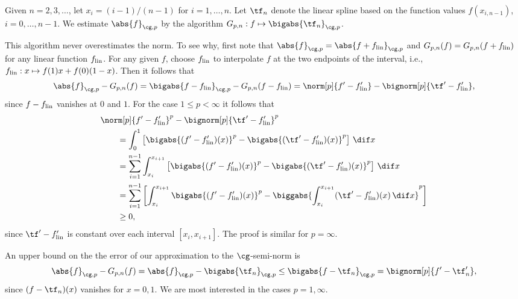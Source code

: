 \documentclass[final]{elsarticle}
\newcommand{\flin}{f_{\text{\rm{lin}}}}
\newcommand{\Gnorm}[2]{\abs{#2}_{\cg,#1}}
\theoremstyle{definition}
\theoremstyle{remark}
\begin{document}
Given $n =2, 3, \ldots$, let $x_i=(i-1)/(n-1)$ for $i=1, \ldots, n$.  Let $\tf_n$ denote the linear spline based on the function values $f(x_{i,n-1})$, $i=0, \ldots, n-1$. We  estimate $\Gnorm{p}{f}$ by the algorithm $G_{p,n}:f \mapsto \bigabs{\tf_n}_{\cg,p}$.  

This algorithm never overestimates the norm.  To see why, first note that $\Gnorm{p}{f}=\Gnorm{p}{f+\flin}$ and $G_{p,n}(f)=G_{p,n}(f+\flin)$ for any linear function $\flin$.  For any given $f$, choose $\flin$ to interpolate $f$ at the two endpoints of the interval, i.e., $\flin:x \mapsto f(1)x+f(0)(1-x)$.  Then it follows that
\[
\Gnorm{p}{f} - G_{p,n}(f) = \bigabs{f-\flin}_{\cg,p}- G_{p,n}(f-\flin) = \norm[p]{f'-\flin'} - \bignorm[p]{\tf'-\flin'},
\]
since $f-\flin$ vanishes at $0$ and $1$. For the case $1 \le p < \infty$ it follows that
\begin{align*}
\MoveEqLeft{\norm[p]{f'-\flin'}^p - \bignorm[p]{\tf'-\flin'}^p}\\
 & = \int_0^1 \left[\bigabs{(f'-\flin')(x)}^p - \bigabs{(\tf'-\flin')(x)}^p \right] \, \dif x \\
& = \sum_{i=1}^{n-1} \int_{x_{i}}^{x_{i+1}} \left[\bigabs{(f'-\flin')(x)}^p - \bigabs{(\tf'-\flin')(x)}^p \right] \, \dif x \\
& = \sum_{i=1}^{n-1} \left[ \int_{x_{i}}^{x_{i+1}} \bigabs{(f'-\flin')(x)}^p - \biggabs{\int_{x_{i}}^{x_{i+1}} (\tf'-\flin')(x) \, \dif x}^p \right] \\
& \ge 0,
\end{align*}
since $\tf'-\flin'$ is constant over each interval $[x_i,x_{i+1}]$.  The proof is similar for $p=\infty$.

An upper bound on the the error of our approximation to the $\cg$-semi-norm is 
\begin{equation*}
\Gnorm{p}{f} - G_{p,n}(f) = \Gnorm{p}{f} - \bigabs{\tf_n}_{\cg,p} \le \bigabs{f-\tf_n}_{\cg,p} = \bignorm[p]{f' -\tf'_n},
\end{equation*}
since $(f-\tf_n)(x)$ vanishes for $x=0,1$.  We are most interested in the cases $p=1,\infty$.
\end{document}
